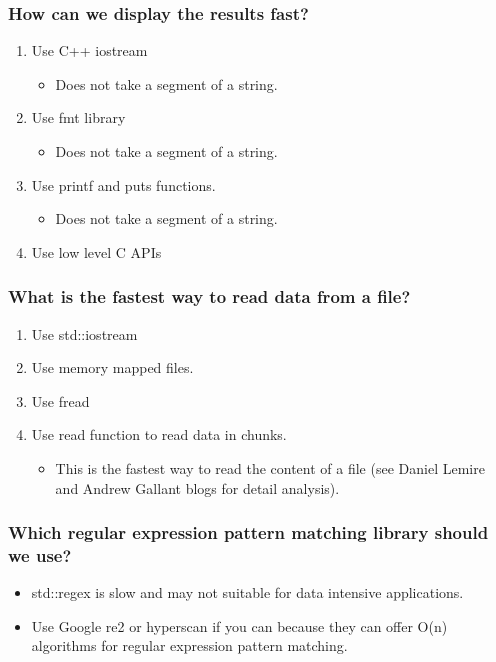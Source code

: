 \documentclass[bigger]{beamer}
\begin{document}
\begin{frame}
    \frametitle{How can we display the results fast?}
    \begin{enumerate}
    \item Use C++ iostream
        \pause
        \begin{itemize}
        \item Does not take a segment of a string.
        \end{itemize}
        \pause
    \item Use fmt library
        \pause
        \begin{itemize}
        \item Does not take a segment of a string.
        \end{itemize}
        \pause
    \item Use printf and puts functions.
        \pause
        \begin{itemize}
        \item Does not take a segment of a string.
        \end{itemize}
        \pause
    \item Use low level C APIs
    \end{enumerate}
\end{frame}

\begin{frame}
    \frametitle{What is the fastest way to read data from a file?}
    \begin{enumerate}
    \item Use std::iostream
        \pause
    \item Use memory mapped files.
        \pause
    \item Use fread
        \pause
    \item Use read function to read data in chunks.
        \pause
        \begin{itemize}
        \item This is the fastest way to read the content of a file
            (see Daniel Lemire and Andrew Gallant blogs for detail analysis).
        \end{itemize}
    \end{enumerate}
\end{frame}

\begin{frame}
    \frametitle{Which regular expression pattern matching library
        should we use?}
    \begin{itemize}
        \pause
    \item std::regex is slow and may not suitable for data intensive
        applications.
        \pause
    \item Use Google re2 or hyperscan if you can because they can offer O(n)
        algorithms for regular expression pattern matching.
    \end{itemize}
\end{frame}
\end{document}
